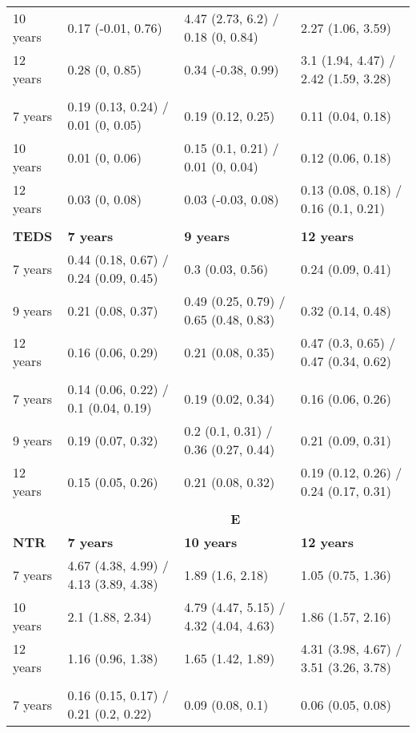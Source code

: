 \begin{tabular}{llll}
10 years & 0.17 (-0.01, 0.76) & 4.47 (2.73, 6.2) / 0.18 (0, 0.84) & 2.27 (1.06, 3.59) \\
12 years & 0.28 (0, 0.85) & 0.34 (-0.38, 0.99) & 3.1 (1.94, 4.47) / 2.42 (1.59, 3.28) \\
      &       &       &  \\
7 years & 0.19 (0.13, 0.24) / 0.01 (0, 0.05) & 0.19 (0.12, 0.25) & 0.11 (0.04, 0.18) \\
10 years & 0.01 (0, 0.06) & 0.15 (0.1, 0.21) / 0.01 (0, 0.04) & 0.12 (0.06, 0.18) \\
12 years & 0.03 (0, 0.08) & 0.03 (-0.03, 0.08) & 0.13 (0.08, 0.18) / 0.16 (0.1, 0.21) \\
      &       &       &  \\
\cmidrule{2-4} \textbf{TEDS} & \textbf{7 years} & \textbf{9 years} & \textbf{12 years} \\
      \midrule
7 years & 0.44 (0.18, 0.67) / 0.24 (0.09, 0.45) & 0.3 (0.03, 0.56) & 0.24 (0.09, 0.41) \\
9 years & 0.21 (0.08, 0.37) & 0.49 (0.25, 0.79) / 0.65 (0.48, 0.83) & 0.32 (0.14, 0.48) \\
12 years & 0.16 (0.06, 0.29) & 0.21 (0.08, 0.35) & 0.47 (0.3, 0.65) / 0.47 (0.34, 0.62) \\
      &       &       &  \\
7 years & 0.14 (0.06, 0.22) / 0.1 (0.04, 0.19) & 0.19 (0.02, 0.34) & 0.16 (0.06, 0.26) \\
9 years & 0.19 (0.07, 0.32) & 0.2 (0.1, 0.31) / 0.36 (0.27, 0.44) & 0.21 (0.09, 0.31) \\
12 years & 0.15 (0.05, 0.26) & 0.21 (0.08, 0.32) & 0.19 (0.12, 0.26) / 0.24 (0.17, 0.31) \\
      &       &       &  \\
      \midrule
      & \multicolumn{3}{c}{\textbf{E}} \\
\cmidrule{2-4} \textbf{NTR} & \textbf{7 years} & \textbf{10 years} & \textbf{12 years} \\
      \midrule
7 years & 4.67 (4.38, 4.99) / 4.13 (3.89, 4.38) & 1.89 (1.6, 2.18) & 1.05 (0.75, 1.36) \\
10 years & 2.1 (1.88, 2.34) & 4.79 (4.47, 5.15) / 4.32 (4.04, 4.63) & 1.86 (1.57, 2.16) \\
12 years & 1.16 (0.96, 1.38) & 1.65 (1.42, 1.89) & 4.31 (3.98, 4.67) / 3.51 (3.26, 3.78) \\
      &       &       &  \\
7 years & 0.16 (0.15, 0.17) / 0.21 (0.2, 0.22) & 0.09 (0.08, 0.1) & 0.06 (0.05, 0.08) \\

\end{tabular}
